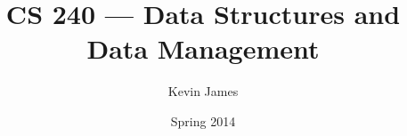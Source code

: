 \documentclass[12pt]{article}
\begin{document}
\title{CS 240 --- Data Structures and Data Management}
\author{Kevin James}
\date{\vspace{-2ex}Spring 2014}
\maketitle\HRule
\end{document}
